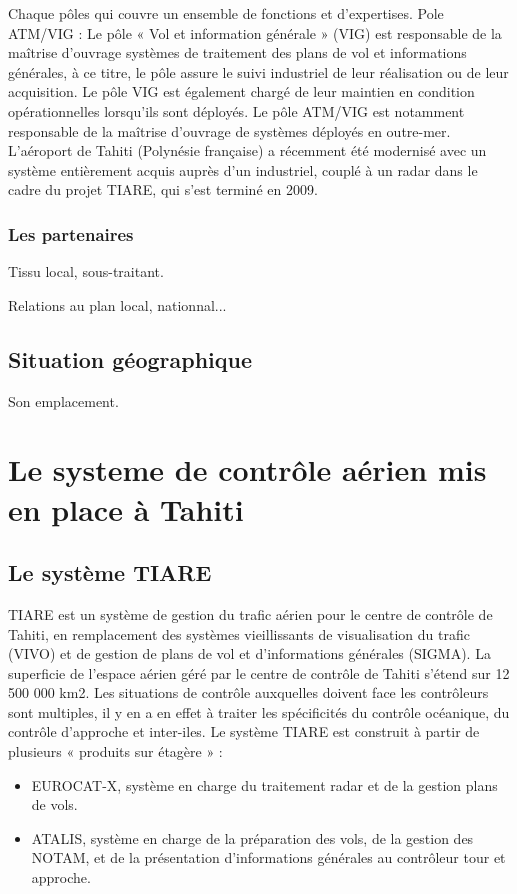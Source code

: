Chaque pôles qui couvre un ensemble de fonctions et d’expertises.
Pole ATM/VIG :
Le pôle « Vol et information générale » (VIG) est responsable de la maîtrise d’ouvrage systèmes de traitement des plans de vol et informations générales, à ce titre, le pôle assure le suivi industriel de leur réalisation ou de leur acquisition. Le pôle VIG est également chargé de leur maintien en condition opérationnelles lorsqu’ils sont déployés.
Le pôle ATM/VIG est notamment responsable de la maîtrise d’ouvrage de systèmes déployés en outre-mer. L’aéroport de Tahiti (Polynésie française) a récemment été modernisé avec un système entièrement acquis auprès d’un industriel, couplé à un radar dans le cadre du projet TIARE, qui s’est terminé en 2009.

    \subsubsection{Les partenaires}
        Tissu local, sous-traitant.
        
        Relations au plan local, nationnal...

    \subsection{Situation géographique}
    
        Son emplacement.

\section[Controle aérien à Thaiti]{Le systeme de contrôle aérien mis en place à Tahiti}
    \subsection{Le système TIARE}
TIARE est un système de gestion du trafic aérien pour le centre de contrôle de Tahiti, en remplacement des systèmes vieillissants de visualisation du trafic (VIVO) et de gestion de plans de vol et d’informations générales (SIGMA). La superficie de l'espace aérien géré par le centre de contrôle de Tahiti s’étend sur 12 500 000 km2. Les situations de contrôle auxquelles doivent face les contrôleurs sont multiples, il y en a en effet à traiter les spécificités du contrôle océanique, du contrôle d’approche et inter-iles. Le système TIARE est construit à partir de plusieurs « produits sur étagère » :
\begin{itemize}
\item EUROCAT-X, système en charge du traitement radar et de la gestion plans de vols.
\item ATALIS, système en charge de la préparation des vols, de la gestion des NOTAM, et de la présentation d’informations générales au contrôleur tour et approche.
\end{itemize}

